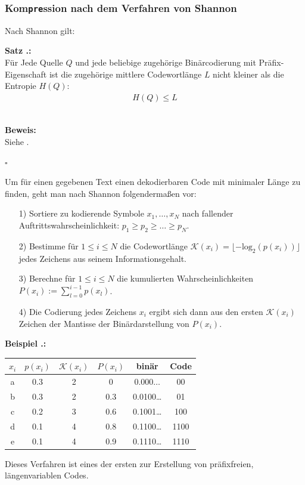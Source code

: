 \documentclass[a4paper,12pt]{article}
\newcounter{Beispiel}
\newcounter{Satz}
\newenvironment{Satz}{
\medskip
        
        \setlength{\parindent}{0pt}
        \addtocounter{Satz}{1}
        \textbf{\textsf{Satz \thesubsection.\theSatz}:}\\}{
        \nopagebreak
        \vspace{-1.0ex}
        \bigskip\\
        
}
\newenvironment{Beispiel}{
\medskip
        
        \setlength{\parindent}{0pt}
        \addtocounter{Beispiel}{1}
        \textbf{\textsf{Beispiel \thesubsection.\theBeispiel}:}\\}{
        \nopagebreak
        \vspace{-1.0ex}
        \bigskip
        
}
\newenvironment{proof}{
        \setlength{\parindent}{0pt}
        \textbf{Beweis:}\\}{
        \nopagebreak
        \vspace{-1.0ex}
        \begin{flushright}
             $\square$
        \end{flushright}
        \bigskip
        
}
\begin{document}
\subsubsection{Kom{\tt{pre}}ssion nach dem Verfahren von Shannon}
Nach Shannon gilt:
\begin{Satz}
Für Jede Quelle $Q$ und jede beliebige zugehörige Binärcodierung mit 
Präfix-Eigenschaft ist die zugehörige mittlere Codewortlänge $L$ 
nicht kleiner als die Entropie $H(Q)$:
\begin{align*}
 H(Q)\leq L
\end{align*}
\end{Satz}
\begin{proof}
Siehe \cite{Rohling}.
\end{proof}
Um für einen gegebenen Text einen dekodierbaren Code mit minimaler Länge zu finden, geht man nach Shannon folgendermaßen vor:
\begin{itemize}
	\item[1)]  Sortiere zu kodierende Symbole $x_{1},\ldots,x_{N}$ nach fallender Auftrittswahrscheinlichkeit: 
$p_{1}\geq p_{2}\geq\ldots\geq p_{N}$.
	\item[2)] Bestimme für $1\leq i \leq N$ die Codewortlänge $\mathcal{K}(x_{i}) = \lfloor -\text{log}_2(p(x_{i}))\rfloor$ jedes Zeichens aus seinem Informationsgehalt.
	\item[3)] Berechne für $1\leq i \leq N$ die kumulierten Wahrscheinlichkeiten $P(x_{i}):=\sum_{l=0}^{i-1}p(x_{l})$.
	\item[4)] Die Codierung jedes Zeichens $x_{i}$ ergibt sich dann aus den ersten $\mathcal{K}(x_{i})$ Zeichen der Mantisse der Binärdarstellung von $P(x_{i})$.
\end{itemize}
\begin{Beispiel}

\begin{center}
\begin{tabular}{c|c|c|c|c|c}
$x_{i}$ & $p(x_{i})$ & $\mathcal{K}(x_{i})$ & $P(x_{i})$ & binär & Code
\\
\hline
a & 0.3 & 2 & 0 & $0.000\ldots$ & 00
\\
\hline
b & 0.3  & 2 & 0.3 & 0.0100\ldots & 01
\\
\hline
c & 0.2  & 3 & 0.6 & 0.1001\ldots & 100
\\
\hline
d & 0.1  & 4 & 0.8 & 0.1100\ldots & 1100
\\
\hline
e & 0.1  & 4 & 0.9 & 0.1110\ldots & 1110
\end{tabular}
\end{center}
\end{Beispiel}
Dieses Verfahren ist eines der ersten zur Erstellung von präfixfreien, längenvariablen Codes.
\end{document}
